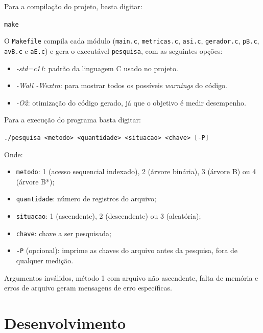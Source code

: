 \documentclass{article}
\begin{document}
Para a compilação do projeto, basta digitar:

\begin{tcolorbox}[title=Compilando o projeto,width=\linewidth]
    \texttt{make}
\end{tcolorbox}

O \texttt{Makefile} compila cada módulo (\texttt{main.c}, \texttt{metricas.c}, \texttt{asi.c}, \texttt{gerador.c}, \texttt{pB.c}, \texttt{avB.c} e \texttt{aE.c}) e gera o executável \texttt{pesquisa}, com as seguintes opções:
\begin{itemize}
    \item [-] \emph{-std=c11}: padrão da linguagem C usado no projeto.
    \item [-] \emph{-Wall -Wextra}: para mostrar todos os possíveis \emph{warnings} do código.
    \item [-] \emph{-O2}: otimização do código gerado, já que o objetivo é medir desempenho.
\end{itemize}

Para a execução do programa basta digitar:
\begin{tcolorbox}[title=Executando o programa,width=\linewidth]
    \texttt{./pesquisa \textless metodo\textgreater{} \textless quantidade\textgreater{} \textless situacao\textgreater{} \textless chave\textgreater{} [-P]}
\end{tcolorbox}

Onde:
\begin{itemize}
    \item [-] \texttt{metodo}: 1 (acesso sequencial indexado), 2 (árvore binária), 3 (árvore B) ou 4 (árvore B*);
    \item [-] \texttt{quantidade}: número de registros do arquivo;
    \item [-] \texttt{situacao}: 1 (ascendente), 2 (descendente) ou 3 (aleatória);
    \item [-] \texttt{chave}: chave a ser pesquisada;
    \item [-] \texttt{-P} (opcional): imprime as chaves do arquivo antes da pesquisa, fora de qualquer medição.
\end{itemize}

Argumentos inválidos, método 1 com arquivo não ascendente, falta de memória e erros de arquivo geram mensagens de erro específicas.

\clearpage
\section{Desenvolvimento}
\end{document}
